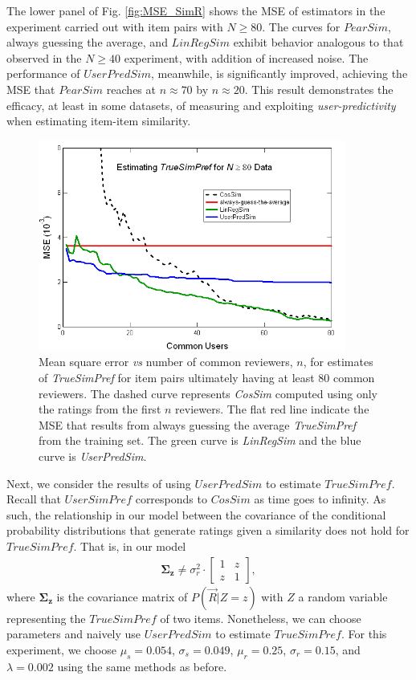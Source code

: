 \documentclass[11pt]{article}
\begin{document}
{The lower panel of Fig. \ref{fig:MSE_SimR} shows the MSE of estimators in the
experiment carried out with item pairs with $N \geq 80$. The curves for
$PearSim$, always guessing the average, and $LinRegSim$ exhibit behavior
analogous to that observed in the $N \geq 40$ experiment, with addition of
increased noise. The performance of $UserPredSim$, meanwhile, is significantly
improved, achieving the MSE that $PearSim$ reaches at $n \approx 70$ by $n
\approx 20$. This result demonstrates the efficacy, at least in some datasets,
of measuring and exploiting {\em user-predictivity} when estimating item-item
similarity.

\begin{figure}[!htbp]
    \centering
    \includegraphics[width=0.9\textwidth]{MSE_SimP_80.png}
	\caption{Mean square error {\em vs} number of common reviewers, $n$, for
estimates of {\em TrueSimPref} for item pairs ultimately having at least 80
common reviewers. The dashed curve represents {\em CosSim} computed using only
the ratings from the first $n$ reviewers. The flat red line indicate the MSE
that results from always guessing the average {\em TrueSimPref} from the
training set. The green curve is {\em LinRegSim} and the blue curve is {\em
UserPredSim}.  }
    \label{fig:MSE_SimP}
\end{figure}

Next, we consider the results of using $UserPredSim$ to estimate $TrueSimPref$.
Recall that $UserSimPref$ corresponds to $CosSim$ as time goes to infinity. As
such, the relationship in our model between the covariance of the conditional
probability distributions that generate ratings given a similarity does not hold
for $TrueSimPref$. That is, in our model
\begin{align}
\mathbf{\Sigma_z} \neq \sigma_r^2 \cdot
\left[ \begin{array}{cc}  1 & z \\ z & 1 \end{array} \right],
\end{align}
where $\mathbf{\Sigma_z}$ is the covariance matrix of $P(\vec{R} | Z=z)$ with
$Z$ a random variable representing the $TrueSimPref$ of two items. Nonetheless,
we can choose parameters and naively use $UserPredSim$ to estimate
$TrueSimPref$. For this experiment, we choose $\mu_s = 0.054$, $\sigma_s =
0.049$, $\mu_r = 0.25$, $\sigma_r = 0.15$, and $\lambda = 0.002$ using the same
methods as before.

}
\end{document}
